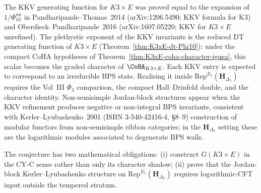 \begin{remark}
\label{rem:K3xE-kkv-evidence}
The KKV generating function for $K3 \times E$ was proved equal to the
expansion of \(1/\Phi_{10}^{\mathrm{un}}\) in
Pandharipande--Thomas~2014 (arXiv:1206.5490; KKV formula for K3) and
Oberdieck--Pandharipande~2016 (arXiv:1607.05220; KKV for $K3 \times E$
unrefined). The plethystic exponent of the KKV invariants is the
reduced DT generating function of $K3 \times E$
(Theorem~\ref{thm:K3xE-dt-Phi10}); under the compact CoHA hypotheses of
Theorem~\ref{thm:K3xE-coha-character-igusa}, this scalar becomes the
graded character of $\CoHA_{K3 \times E}$. Each KKV entry is expected to
correspond to an irreducible BPS state. Realising it inside
$\mathrm{Rep}^{E_1}(\mathbf{H}_{\Delta_5})$ requires the Vol~III
$\Phi_3$ comparison, the compact Hall--Drinfeld double, and the
character identity.
Non-semisimple Jordan-block structures appear when the KKV refinement
produces negative or non-integral BPS invariants, consistent with
Kerler--Lyubashenko~2001 (ISBN 3-540-42416-4, \S8--9) construction of
modular functors from non-semisimple ribbon categories; in the
$\mathbf{H}_{\Delta_5}$ setting these are the logarithmic modules
associated to degenerate BPS walls.

The conjecture has two mathematical obligations: (i)
construct \(G(K3\times E)\) in the CY-C sense rather than only its
character shadow; (ii) prove that the Jordan-block
Kerler--Lyubashenko structure on
$\mathrm{Rep}^{E_1}(\mathbf{H}_{\Delta_5})$ requires logarithmic-CFT
input outside the tempered stratum.
\end{remark}

